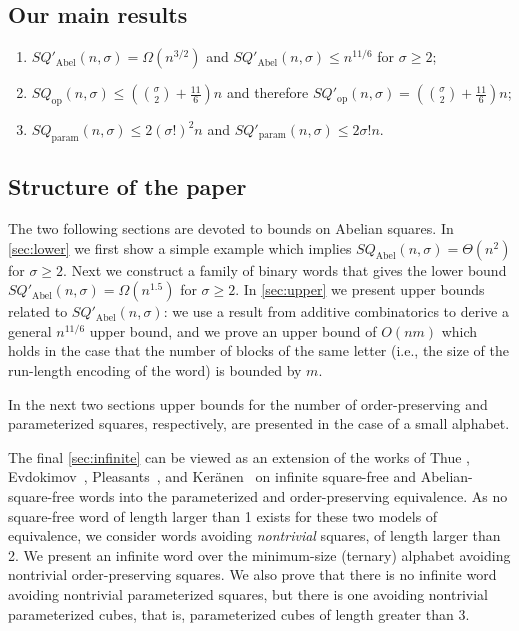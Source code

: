 \documentclass{article}
\theoremstyle{plain}
\theoremstyle{definition}
\theoremstyle{remark}
\newcommand{\SQ}{\mathit{SQ}}
\newcommand{\SQABEL}{\SQ_{\mathrm{Abel}}}
\newcommand{\SQPABEL}{\SQ'_{\mathrm{Abel}}}
\newcommand{\SQPARAM}{\SQ_{\mathrm{param}}}
\newcommand{\SQPPARAM}{\SQ'_{\mathrm{param}}}
\newcommand{\SQOP}{\SQ_{\mathrm{op}}}
\newcommand{\SQPOP}{\SQ'_{\mathrm{op}}}
\begin{document}
  \subsection*{Our main results}
  \begin{enumerate}[1.]
    \item $\SQPABEL(n,\sigma)=\Omega(n^{3/2})$ and $\SQPABEL(n,\sigma) \le n^{11/6}$ for $\sigma \ge 2$;
    \item $\SQOP(n,\sigma)\le (\binom{\sigma}{2}+\frac{11}{6})n$ and therefore $\SQPOP(n,\sigma)=(\binom{\sigma}{2}+\frac{11}{6})n$;
    \item $\SQPARAM(n,\sigma)\le 2(\sigma!)^2n$ 
      and $\SQPPARAM(n,\sigma)\le 2\sigma!n$.
  \end{enumerate}

  \subsection*{Structure of the paper}
  The two following sections are devoted to bounds on Abelian squares.
  In \cref{sec:lower} we first show a simple example which implies $\SQABEL(n,\sigma)=\Theta(n^2)$ for $\sigma \ge 2$.
  Next we construct a family of binary words that gives the lower bound $\SQPABEL(n,\sigma) = \Omega(n^{1.5})$ for $\sigma \ge 2$.
  In \cref{sec:upper} we present upper bounds related to $\SQPABEL(n,\sigma)$:
  we use a result from additive combinatorics to derive a general $n^{11/6}$ upper bound,
  and we prove an upper bound of $O(nm)$ which holds in the case that the number of blocks
  of the same letter (i.e., the size of the run-length encoding of the word) is bounded by $m$.  

  In the next two sections upper bounds for the number of order-preserving and parameterized squares,
  respectively, are presented in the case of a small alphabet.

  The final \cref{sec:infinite} can be viewed as an extension of the
  works of Thue \cite{Thue}, Evdokimov~\cite{evdokimov}, Pleasants~\cite{Pleasants}, and Ker\"anen~\cite{DBLP:conf/icalp/Keranen92}
  on infinite square-free and Abelian-square-free words into the parameterized and order-preserving equivalence.
  As no square-free word of length larger than 1 exists for these two models of equivalence,
  we consider words avoiding \emph{nontrivial} squares, of length larger than 2.
  We present an infinite word over the minimum-size (ternary) alphabet
  avoiding nontrivial order-preserving squares.
  We also prove that there is no infinite word avoiding nontrivial parameterized squares,
  but there is one avoiding nontrivial parameterized cubes, that is,
  parameterized cubes of length greater than 3.
\end{document}
